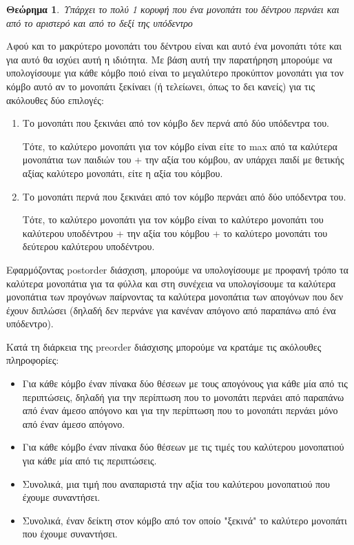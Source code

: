 \documentclass[a4paper,oneside, 11pt]{article}
\newtheorem{theorem}{Θεώρημα}
\begin{document}
\begin{theorem}{Υπάρχει το πολύ 1 κορυφή που ένα μονοπάτι του δέντρου περνάει και από το αριστερό και από το δεξί της υπόδεντρο}
\end{theorem}
Αφού και το μακρύτερο μονοπάτι του δέντρου είναι και αυτό ένα μονοπάτι τότε και για αυτό θα ισχύει αυτή η ιδιότητα. Με βάση αυτή την παρατήρηση μπορούμε να υπολογίσουμε για κάθε κόμβο ποιό είναι το μεγαλύτερο προκύπτον μονοπάτι για τον κόμβο αυτό αν το μονοπάτι ξεκίναει (ή τελείωνει, όπως το δει κανείς) για τις ακόλουθες δύο επιλογές:
\begin{enumerate}
\item Το μονοπάτι που ξεκινάει από τον κόμβο δεν περνά από δύο υπόδεντρα του. \bigbreak

Τότε, το καλύτερο μονοπάτι για τον κόμβο είναι είτε το max από τα καλύτερα μονοπάτια των παιδιών του + την αξία του κόμβου, αν υπάρχει παιδί με θετικής αξίας καλύτερο μονοπάτι, είτε η αξία του κόμβου.

\item Το μονοπάτι περνά που ξεκινάει από τον κόμβο περνάει από δύο υπόδεντρα του. \bigbreak 

Τότε, το καλύτερο μονοπάτι για τον κόμβο είναι το καλύτερο μονοπάτι του καλύτερου υποδέντρου + την αξία του κόμβου + το καλύτερο μονοπάτι του δεύτερου καλύτερου υποδέντρου.
\end{enumerate}

Εφαρμόζοντας postorder διάσχιση, μπορούμε να υπολογίσουμε με προφανή τρόπο τα καλύτερα μονοπάτια για τα φύλλα και στη συνέχεια να υπολογίσουμε τα καλύτερα μονοπάτια των προγόνων παίρνοντας τα καλύτερα μονοπάτια των απογόνων που δεν έχουν διπλώσει (δηλαδή δεν περνάνε για κανέναν απόγονο από παραπάνω από ένα υπόδεντρο). \bigbreak 


Κατά τη διάρκεια της preorder διάσχισης μπορούμε να κρατάμε τις ακόλουθες πληροφορίες:
\begin{itemize}
\item Για κάθε κόμβο έναν πίνακα δύο θέσεων με τους απογόνους για κάθε μία από τις περιπτώσεις, δηλαδή για την περίπτωση που το μονοπάτι περνάει από παραπάνω από έναν άμεσο απόγονο και για την περίπτωση που το μονοπάτι περνάει μόνο από έναν άμεσο απόγονο.
\item Για κάθε κόμβο έναν πίνακα δύο θέσεων με τις τιμές του καλύτερου μονοπατιού για κάθε μία από τις περιπτώσεις.
\item Συνολικά, μια τιμή που αναπαριστά την αξία του καλύτερου μονοπατιού που έχουμε συναντήσει.
\item Συνολικά, έναν δείκτη στον κόμβο από τον οποίο "ξεκινά" το καλύτερο μονοπάτι που έχουμε συναντήσει.
\end{itemize}
\end{document}
